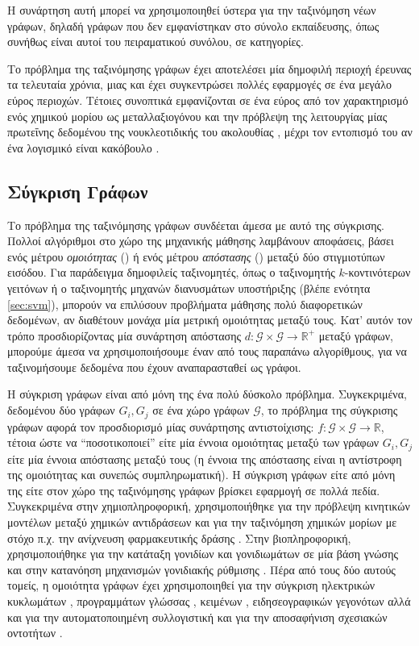 Η συνάρτηση αυτή μπορεί να χρησιμοποιηθεί ύστερα για την ταξινόμηση νέων γράφων, δηλαδή γράφων που δεν εμφανίστηκαν στο σύνολο εκπαίδευσης, όπως συνήθως είναι αυτοί του πειραματικού συνόλου, σε κατηγορίες.\par
Το πρόβλημα της ταξινόμησης γράφων έχει αποτελέσει μία δημοφιλή περιοχή έρευνας τα τελευταία χρόνια, μιας και έχει συγκεντρώσει πολλές εφαρμογές σε ένα μεγάλο εύρος περιοχών.
Τέτοιες συνοπτικά εμφανίζονται σε ένα εύρος από τον χαρακτηρισμό ενός χημικού μορίου ως μεταλλαξιογόνου \cite{Swamidass2005} και την πρόβλεψη της λειτουργίας μίας πρωτεΐνης δεδομένου της νουκλεοτιδικής του ακολουθίας \cite{Borgwardt2005}, μέχρι τον εντοπισμό του αν ένα λογισμικό είναι κακόβουλο \cite{Wagner2009}.
\subsection{Σύγκριση Γράφων}
Το πρόβλημα της ταξινόμησης γράφων συνδέεται άμεσα με αυτό της σύγκρισης.
Πολλοί αλγόριθμοι στο χώρο της μηχανικής μάθησης λαμβάνουν αποφάσεις, βάσει ενός μέτρου \textit{ομοιότητας} () ή ενός μέτρου \textit{απόστασης} () μεταξύ δύο στιγμιοτύπων εισόδου.
Για παράδειγμα δημοφιλείς ταξινομητές, όπως ο ταξινομητής $k$-κοντινότερων γειτόνων ή ο ταξινομητής μηχανών διανυσμάτων υποστήριξης (βλέπε ενότητα \ref{sec:svm}), μπορούν να επιλύσουν προβλήματα μάθησης πολύ διαφορετικών δεδομένων, αν διαθέτουν μονάχα μία μετρική ομοιότητας μεταξύ τους.
Κατ' αυτόν τον τρόπο προσδιορίζοντας μία συνάρτηση απόστασης $d : \mathcal{G} \times \mathcal{G} \rightarrow \mathbb{R}^{+}$ μεταξύ γράφων, μπορούμε άμεσα να χρησιμοποιήσουμε έναν από τους παραπάνω αλγορίθμους, για να ταξινομήσουμε δεδομένα που έχουν αναπαρασταθεί ως γράφοι.\par
Η σύγκριση γράφων είναι από μόνη της ένα πολύ δύσκολο πρόβλημα.
Συγκεκριμένα, δεδομένου δύο γράφων $G_{i}, G_{j}$ σε ένα χώρο γράφων $\mathcal{G}$, το πρόβλημα της σύγκρισης γράφων αφορά τον προσδιορισμό μίας συνάρτησης αντιστοίχισης: $f: \mathcal{G} \times \mathcal{G} \rightarrow \mathbb{R}$, τέτοια ώστε να ``ποσοτικοποιεί'' είτε μία έννοια ομοιότητας μεταξύ των γράφων $G_{i}, G_{j}$ είτε μία έννοια απόστασης μεταξύ τους (η έννοια της απόστασης είναι η αντίστροφη της ομοιότητας και συνεπώς συμπληρωματική).
Η σύγκριση γράφων είτε από μόνη της είτε στον χώρο της ταξινόμησης γράφων βρίσκει εφαρμογή σε πολλά πεδία.
Συγκεκριμένα στην χημιοπληροφορική, χρησιμοποιήθηκε για την πρόβλεψη κινητικών μοντέλων μεταξύ χημικών αντιδράσεων \cite{Genesys} και για την ταξινόμηση χημικών μορίων με στόχο π.χ. την ανίχνευση φαρμακευτικής δράσης \cite{Wale2008}.
Στην βιοπληροφορική, χρησιμοποιήθηκε για την κατάταξη γονιδίων και γονιδιωμάτων σε μία βάση γνώσης\cite{KEGG, Hattori2003} και στην κατανόηση μηχανισμών γονιδιακής ρύθμισης \cite{Davidson1669}.
Πέρα από τους δύο αυτούς τομείς, η ομοιότητα γράφων έχει χρησιμοποιηθεί για την σύγκριση ηλεκτρικών κυκλωμάτων \cite{Takashima1988}, προγραμμάτων γλώσσας  \cite{Gitchell1999}, κειμένων \cite{Rousseau2015TextCA}, ειδησεογραφικών γεγονότων \cite{Glavas2013} αλλά και για την αυτοματοποιημένη συλλογιστική \cite{Tsivtsivadze2011} και για την αποσαφήνιση σχεσιακών οντοτήτων \cite{Hermansson2013EntityDI}.
